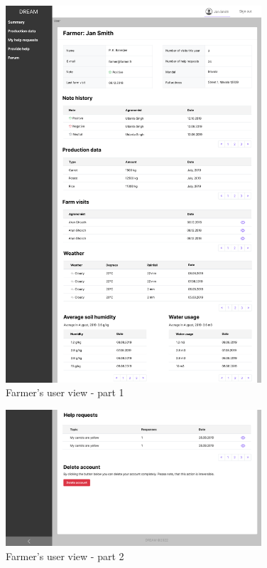 \begin{figure}[H]
\centering
\includegraphics[width=0.85\textwidth]{mockups/Farmer_User_part1.png}
\caption{Farmer's user view - part 1}
\end{figure}

\begin{figure}[H]
\centering
\includegraphics[width=0.85\textwidth]{mockups/Farmer_User_part2.png}
\caption{Farmer's user view - part 2}
\end{figure}

